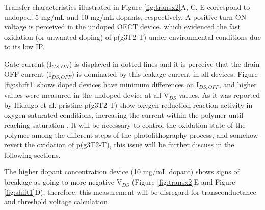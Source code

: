 Transfer characteristics illustrated in Figure \ref{fig:transx2}A, C, E correspond to undoped, 5 mg/mL and 10 mg/mL dopants, respectively. A positive turn ON voltage is perceived in the undoped OECT device, which evidenced the fast oxidation (or unwanted doping) of p(g3T2-T) under environmental conditions due to its low IP. 

Gate current (I$_{GS,ON}$) is displayed in dotted lines and it is perceive that the drain OFF current (I$_{DS,OFF}$) is dominated by this leakage current in all devices. Figure \ref{fig:shift1} shows doped devices have minimum differences on I$_{DS,OFF}$, and higher values were measured in the undoped device at all V$_{DS}$ values. As it was reported by Hidalgo et al. pristine p(g3T2-T) show oxygen reduction reaction activity in oxygen-saturated conditions, increasing the current within the polymer until reaching saturation \cite{hidalgocastilloSimultaneousPerformanceStability2022a}. It will be necessary to control the oxidation state of the polymer among the different steps of the photolithography process, and somehow revert the oxidation of p(g3T2-T), this issue will be further discuss in the following sections.

The higher dopant concentration device (10 mg/mL dopant) shows signs of breakage as going to more negative V$_{DS}$ (Figure \ref{fig:transx2}E and Figure \ref{fig:shift1}D), therefore, this measurement will be disregard for transconductance and threshold voltage calculation.

